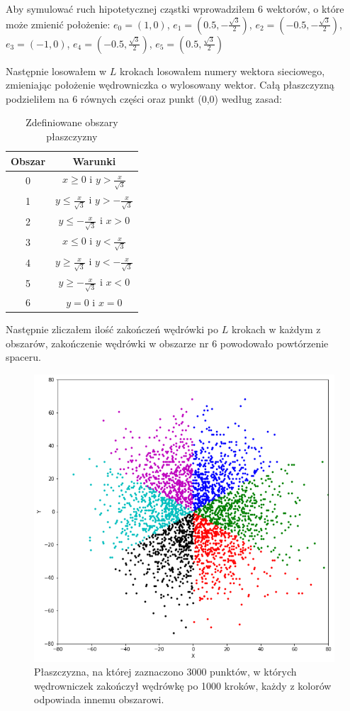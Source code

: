 \documentclass[]{scrartcl}
\begin{document}
Aby symulować ruch hipotetycznej cząstki wprowadziłem 6 wektorów, o które może zmienić położenie: $e_0 = (1,0)$,  $e_1 = (0.5, -\frac{\sqrt{3}}{2})$,  $e_2 = (-0.5, -\frac{\sqrt{3}}{2})$,  $e_3 = (-1,0)$,  $e_4 = (-0.5, \frac{\sqrt{3}}{2})$,  $e_5 = (0.5, \frac{\sqrt{3}}{2}) $

Następnie losowałem w $L$ krokach losowałem numery wektora sieciowego, zmieniając położenie wędrowniczka o wylosowany wektor. Całą płaszczyzną podzieliłem na 6 równych części oraz punkt (0,0) według zasad:

\begin{table}[h!]
	\centering
	\caption{Zdefiniowane obszary płaszczyzny}
	\begin{tabular}{|c| c|}
		\hline
		Obszar & Warunki \\ \hline
		0  & $x\geq0$ i $y>\frac{x}{\sqrt{3}}$   \\ \hline
		1  & $y\leq\frac{x}{\sqrt{3}}$ i $y > -\frac{x}{\sqrt{3}}$\\ \hline
		2  & $y\leq - \frac{x}{\sqrt{3}}$ i $x > 0$   \\ \hline
		3  & $x\leq 0 $ i $y < \frac{x}{\sqrt{3}}$  \\ \hline
		4  & $y \geq \frac{x}{\sqrt{3}}$  i $y < - \frac{x}{\sqrt{3}}$ \\ \hline
		5  & $y \geq -\frac{x}{\sqrt{3}}$  i $x < 0$ \\ \hline
	    6  & $y = 0 $  i  $x = 0$ \\ \hline
	\end{tabular}
\end{table}

Następnie zliczałem ilość zakończeń wędrówki po $L$ krokach w każdym z obszarów, zakończenie wędrówki w obszarze nr 6 powodowało powtórzenie spaceru.
 

\begin{figure}[!h]
	\centering
	\includegraphics[width=0.8\linewidth]{hex_col}
	\caption{Płaszczyzna, na której zaznaczono 3000 punktów, w których wędrowniczek zakończył wędrówkę po 1000 kroków, każdy z kolorów odpowiada innemu obszarowi.}
\end{figure}
\end{document}
